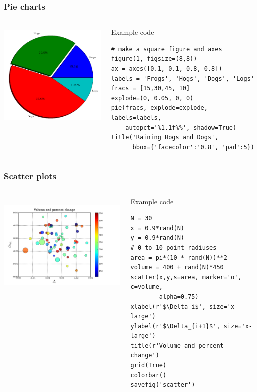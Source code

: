 \documentclass[14pt,compress]{beamer}
\begin{document}
\begin{frame}[fragile] \frametitle{Pie charts}
  \begin{columns}
    \hspace*{-0.4in}
  \includegraphics[height=2.0in, interpolate=true]{data/piechart}  
    \begin{block}{Example code}
    \tiny
\begin{lstlisting}
# make a square figure and axes
figure(1, figsize=(8,8))
ax = axes([0.1, 0.1, 0.8, 0.8])
labels = 'Frogs', 'Hogs', 'Dogs', 'Logs'
fracs = [15,30,45, 10]
explode=(0, 0.05, 0, 0)
pie(fracs, explode=explode, labels=labels, 
    autopct='%1.1f%%', shadow=True)
title('Raining Hogs and Dogs', 
      bbox={'facecolor':'0.8', 'pad':5})
\end{lstlisting}
  \end{block}
\end{columns}
\end{frame}

\begin{frame}[fragile] \frametitle{Scatter plots}
  \begin{columns}
    \hspace*{-0.4in}
  \includegraphics[height=2in, interpolate=true]{data/scatter}  
    \begin{block}{Example code}
    \tiny
\begin{lstlisting}
N = 30
x = 0.9*rand(N)
y = 0.9*rand(N)
# 0 to 10 point radiuses
area = pi*(10 * rand(N))**2 
volume = 400 + rand(N)*450
scatter(x,y,s=area, marker='o', c=volume, 
        alpha=0.75)
xlabel(r'$\Delta_i$', size='x-large')
ylabel(r'$\Delta_{i+1}$', size='x-large')
title(r'Volume and percent change')
grid(True)
colorbar()
savefig('scatter')
\end{lstlisting}
  \end{block}
\end{columns}
\end{frame}
\end{document}

